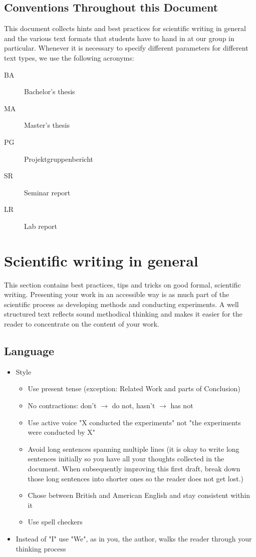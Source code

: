 \documentclass[nodate]{proc}
\begin{document}
\subsection{Conventions Throughout this Document}
This document collects hints and best practices for scientific writing in general and the various text formats that students have to hand in at our group in particular.
Whenever it is necessary to specify different parameters for different text types, we use the following acronyms:
\begin{description}
\item[BA] Bachelor's thesis
\item[MA] Master's thesis
\item[PG] Projektgruppenbericht
\item[SR] Seminar report
\item[LR] Lab report
\end{description}

\section{Scientific writing in general}
This section contains best practices, tips and tricks on good formal, scientific writing. Presenting your work in an accessible way is as much part of the scientific process as developing methods and conducting experiments. A well structured text reflects sound methodical thinking and makes it easier for the reader to concentrate on the content of your work. \cite{zobel_writing}

\subsection{Language}
\begin{itemize}

	\item Style
	\begin{itemize}
		\item Use present tense (exception: Related Work and parts of Conclusion)
		\item No contractions: don't $\rightarrow$ do not, hasn't $\rightarrow$ has not
		\item Use active voice "X conducted the experiments" not "the experiments were conducted by X"
		\item Avoid long sentences spanning multiple lines (it is okay to write long sentences initially so you have all your thoughts collected in the document. When subsequently improving this first draft, break down those long sentences into shorter ones so the reader does not get lost.)
		\item Chose between British and American English and stay consistent within it
		\item Use spell checkers
	\end{itemize}
	\item Instead of "I" use "We", as in you, the author, walks the reader through your thinking process
\end{itemize}
\end{document}
